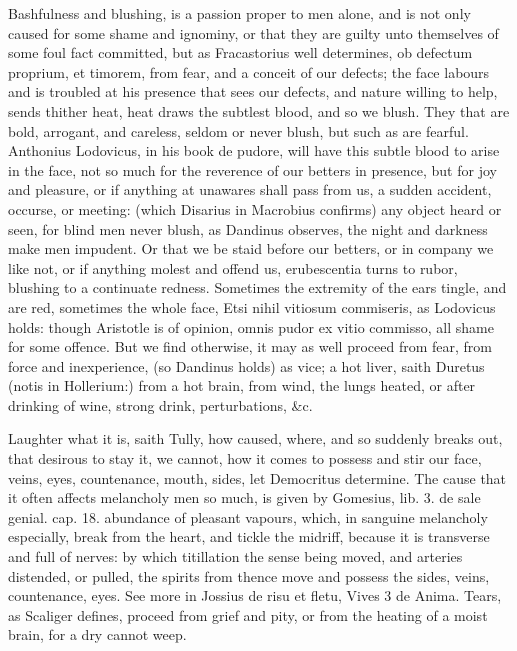 {Bashfulness and blushing, is a passion proper to men alone, and
is not only caused for some shame and ignominy, or that they are
guilty unto themselves of some foul fact committed, but as
Fracastorius well determines, ob defectum proprium, et timorem,
from fear, and a conceit of our defects; the face labours and is
troubled at his presence that sees our defects, and nature willing to
help, sends thither heat, heat draws the subtlest blood, and so we
blush. They that are bold, arrogant, and careless, seldom or never
blush, but such as are fearful. Anthonius Lodovicus, in his book de
pudore, will have this subtle blood to arise in the face, not so much
for the reverence of our betters in presence, but for joy and
pleasure, or if anything at unawares shall pass from us, a sudden
accident, occurse, or meeting: (which Disarius in  Macrobius
confirms) any object heard or seen, for blind men never blush, as
Dandinus observes, the night and darkness make men impudent. Or that we
be staid before our betters, or in company we like not, or if anything
molest and offend us, erubescentia turns to rubor, blushing to a
continuate redness. Sometimes the extremity of the ears tingle,
and are red, sometimes the whole face, Etsi nihil vitiosum commiseris,
as Lodovicus holds: though Aristotle is of opinion, omnis pudor ex
vitio commisso, all shame for some offence. But we find otherwise, it
may as well proceed from fear, from force and inexperience, (so
Dandinus holds) as vice; a hot liver, saith Duretus (notis in
Hollerium:) from a hot brain, from wind, the lungs heated, or after
drinking of wine, strong drink, perturbations, \&c.

Laughter what it is, saith Tully, how caused, where, and so
suddenly breaks out, that desirous to stay it, we cannot, how it comes
to possess and stir our face, veins, eyes, countenance, mouth, sides,
let Democritus determine. The cause that it often affects melancholy
men so much, is given by Gomesius, lib. 3. de sale genial. cap. 18.
abundance of pleasant vapours, which, in sanguine melancholy
especially, break from the heart, and tickle the midriff, because
it is transverse and full of nerves: by which titillation the sense
being moved, and arteries distended, or pulled, the spirits from thence
move and possess the sides, veins, countenance, eyes. See more in
Jossius de risu et fletu, Vives 3 de Anima. Tears, as Scaliger defines,
proceed from grief and pity, or from the heating of a moist
brain, for a dry cannot weep.

}
